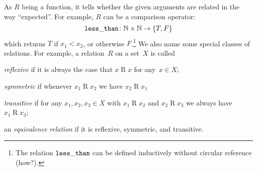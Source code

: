 As $R$ being a function, it tells whether the given arguments are related in the
way ``expected''. For example, $R$ can be a comparison operator:
\[
  {\tt less\_than}\colon \mathbb{N} \times \mathbb{N} \to \{T, F\}
\]
which returns $T$ if $x_1 < x_2$, or otherwise $F$.\footnote{%
  The relation ${\tt less\_than}$ can be defined inductively without circular
  reference (how?).}
We also name some special classes of relations. For example,
a relation~$R$ on a set~$X$ is called
\begin{inparaenum}[(a)]
  \item \emph{reflexive} if it is always the case that $x\mathbin{R}x$ for
    any~$x \in X$;
  \item \emph{symmetric} if whenever $x_1 \mathbin{R} x_2$ we have $x_2
    \mathbin{R} x_1$
  \item \emph{transitive} if for any $x_1, x_2, x_3 \in X$ with $x_1 \mathbin{R}
    x_2$ and $x_2 \mathbin{R} x_3$ we always have $x_1 \mathbin{R} x_3$;
  \item an \emph{equivalence relation} if it is reflexive, symmetric, and
    transitive.
\end{inparaenum}

